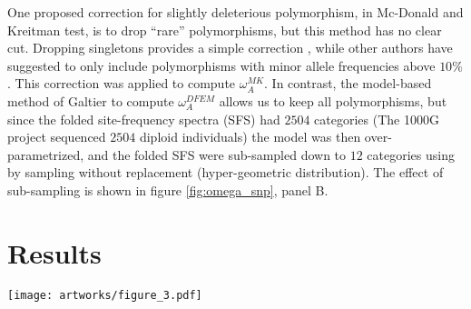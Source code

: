 \documentclass{article}
\begin{document}
	One proposed correction for slightly deleterious polymorphism, in Mc-Donald and Kreitman test, is to drop “rare” polymorphisms, but this method has no clear cut. Dropping singletons provides a simple correction \cite{templeton_contingency_1996}, while other authors have suggested to only include polymorphisms with minor allele frequencies above $10\%$ \cite{smith_adaptive_2002, fay_testing_2002, gojobori_adaptive_2007}. This correction was applied  to compute $\omega_A^{MK}$. In contrast, the model-based method of Galtier to compute $\omega_A^{DFEM}$ allows us to keep all polymorphisms, but since the folded site-frequency spectra (SFS) had $2504$ categories (The 1000G project sequenced $2504$ diploid individuals) the model was then over-parametrized, and the folded SFS were sub-sampled down to $12$ categories using by sampling without replacement (hyper-geometric distribution). The effect of sub-sampling is shown in figure \ref{fig:omega_snp}, panel B.
	

	\section*{Results}
		\begin{figure*}[hb!]
			\centering
			\texttt{[image: artworks/figure\_3.pdf]}\\
			\caption{ \textbf{Empirical distribution of $\omega_A^{MK}$}
				\textbf{Panel A:} $\omega_A^{MK}$ was computed on the concatenate of the $27$ CDS having a high rate of adaptation (outliers, orange solid line), detected in phylogeny-based method. The result was compared to the empirical null distribution of $\omega_A^{MK}$ (green histogram), obtained by randomly sampling a subset of $27$ CDS from the $1,355$ CDS ($100,000$ replicates). The deviation is not significant ($p_{\mathrm{value}}=0.119$).
				\textbf{Panel B:} Sub-sampling the site-frequency-spectrum (SFS) did not affect much the estimation of $\omega_A^{DFEM}$. The dashed line is the $95 \%$ confidence interval around the mean value computed for random sample of $27$ CDS.
				\textbf{Panel C:} Synonymous versus non-synonymous folded SFS,  sub-sampled down to $12$ categories. On top the SFS in the $27$ outliers. On bottom the SFS of all CDS.
				\textbf{Panel D:}. $\omega_A^{DFEM}$ was computed on the concatenate of the $27$ CDS having a high rate of adaptation (outliers, orange solid line), detected in phylogeny-based method. The result was compared to the null empirical distribution of $\omega_A^{DFEM}$ (green histogram), obtained by randomly sampling a subset of $27$ CDS from the $1,355$ CDS ($100,000$ replicates). \label{fig:omega_snp}}
	\end{figure*}
\end{document}
